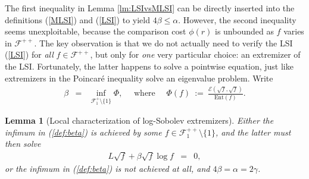 \documentclass[12pt,final]{article}
\newtheorem{lemma}{Lemma}[section]
\numberwithin{equation}{section}
\newcommand{\Ent}{\mathrm{Ent}}
\newcommand{\cE}{\mathscr {E}}
\newcommand{\cF}{\mathcal {F}}
\begin{document}
The first inequality in Lemma \ref{lm:LSIvsMLSI} can be directly inserted into the definitions (\ref{MLSI}) and (\ref{LSI}) to yield $4\beta\le\alpha$. However, the second inequality seems unexploitable, because the comparison cost $\phi(r)$ is unbounded as $f$ varies in  $\cF^{++}$. The key observation is that we do not actually need to verify the LSI (\ref{LSI}) for \emph{all}  $f\in\cF^{++}$, but only for \emph{one} very particular choice: an extremizer of the LSI. Fortunately, the latter happens to solve a pointwise equation, just like extremizers in the Poincaré inequality solve an eigenvalue problem. Write
\begin{eqnarray}
\label{def:beta}
\beta & = & \inf_{\cF^+_1\setminus\{1\}}\Phi,\quad \textrm{ where }\quad\Phi(f) \ := \ \frac{\cE(\sqrt{f},\sqrt{f})}{\Ent(f)}.
\end{eqnarray}
\begin{lemma}[Local characterization of log-Sobolev extremizers]\label{lm:LSI}Either  the infimum in (\ref{def:beta}) is achieved by some $f\in\cF^{++}_1\setminus\{1\}$, and the latter must then solve
\begin{eqnarray}
\label{local}
 L \sqrt{f} + \beta \sqrt{f}\log f & = & 0,
\end{eqnarray}
or the infimum in (\ref{def:beta}) is not achieved at all, and   $4\beta=\alpha=2\gamma$.
\end{lemma}
\end{document}
